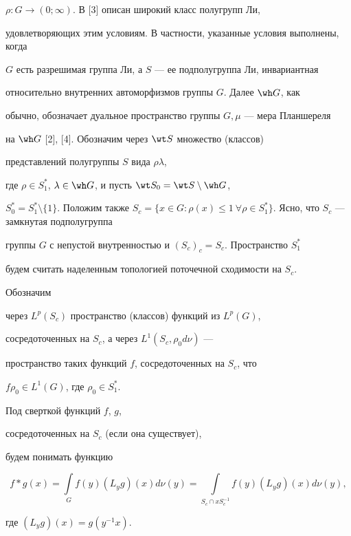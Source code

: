 $\rho:G\to (0;\infty)$. В [3] описан широкий класс полугрупп Ли,


удовлетворяющих этим условиям. В частности, указанные условия выполнены, когда


$G$ есть разрешимая группа Ли, а $S$ --- ее подполугруппа Ли, инвариантная


относительно внутренних автоморфизмов группы $G$. Далее $\wh G$, как


обычно, обозначает дуальное пространство группы $G, \mu$ --- мера Планшереля


на $\wh G$ [2], [4]. Обозначим через $\wt S$ множество (классов)


представлений полугруппы $S$ вида $\rho\lambda$,


где $\rho\in S_1^*$, $\lambda\in


\wh G$, и пусть $\wt S_0 = \wt S\setminus \wh G$,


$S_0^* = S_1^*\setminus\{1\}$. Положим также $S_c = \{x\in G:\rho(x)\leq 1


\ \forall\rho\in S_1^*\}$. Ясно, что $S_c$ --- замкнутая подполугруппа


группы $G$ с непустой внутренностью и $(S_c)_c = S_c$. Пространство $S^*_1$


будем считать наделенным топологией поточечной сходимости на $S_c$.


Обозначим


через $L^p(S_c)$ пространство (классов) функций из $L^p(G)$,


сосредоточенных на $S_c$, а через $L^1(S_c,\rho_0d\nu)$ ---


пространство таких функций $f$, сосредоточенных на $S_c$, что


$f\rho_0\in L^1(G)$, где $\rho_0\in S^*_1$.





Под сверткой функций $f$, $g$,


сосредоточенных на $S_c$ (если она существует),


будем понимать функцию


$$


f\ast g(x) = \int\limits_{G}f(y)(L_yg)(x)d\nu(y) =


\int\limits_{S_c\cap xS_c^{-1}}f(y)(L_yg)(x)d\nu(y),


$$


где $(L_yg)(x) = g(y^{-1}x)$.


\medskip





